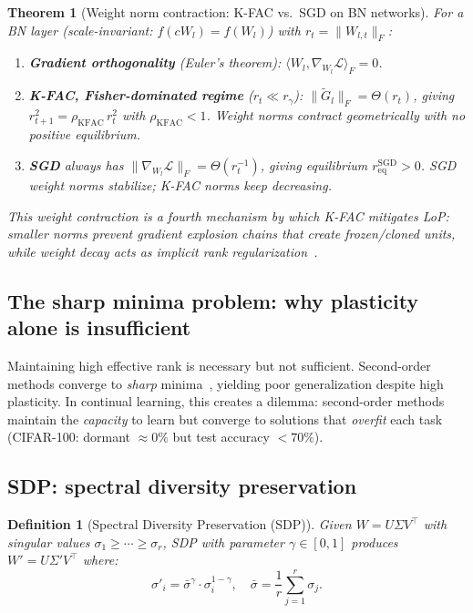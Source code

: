 \documentclass{article}
\newtheorem{theorem}{Theorem}
\newtheorem{definition}{Definition}
\newcommand{\cL}{\mathcal{L}}
\begin{document}
\begin{theorem}[Weight norm contraction: K-FAC vs.\ SGD on BN networks]
\label{thm:weight_contraction}
For a BN layer (scale-invariant: $f(cW_l) = f(W_l)$) with $r_t = \|W_{l,t}\|_F$:
\begin{enumerate}[nosep]
    \item \textbf{Gradient orthogonality} (Euler's theorem): $\langle W_l, \nabla_{W_l}\cL\rangle_F = 0$.
    \item \textbf{K-FAC, Fisher-dominated regime} ($r_t \ll r_\gamma$): $\|\tilde{G}_l\|_F = \Theta(r_t)$, giving $r_{t+1}^2 = \rho_{\mathrm{KFAC}}\, r_t^2$ with $\rho_{\mathrm{KFAC}} < 1$. Weight norms contract \emph{geometrically with no positive equilibrium}.
    \item \textbf{SGD} always has $\|\nabla_{W_l}\cL\|_F = \Theta(r_t^{-1})$, giving equilibrium $r_{\mathrm{eq}}^{\mathrm{SGD}} > 0$. SGD weight norms stabilize; K-FAC norms keep decreasing.
\end{enumerate}
This weight contraction is a fourth mechanism by which K-FAC mitigates LoP: smaller norms prevent gradient explosion chains that create frozen/cloned units, while weight decay acts as implicit rank regularization~\citep{wu2026rank}.
\end{theorem}

\subsection{The sharp minima problem: why plasticity alone is insufficient}

Maintaining high effective rank is necessary but not sufficient. Second-order methods converge to \emph{sharp} minima~\citep{keskar2017largebatch, shin2025sassha}, yielding poor generalization despite high plasticity. In continual learning, this creates a dilemma: second-order methods maintain the \emph{capacity} to learn but converge to solutions that \emph{overfit} each task (CIFAR-100: dormant $\approx 0\%$ but test accuracy $< 70\%$).

\subsection{SDP: spectral diversity preservation}

\begin{definition}[Spectral Diversity Preservation (SDP)]
\label{def:sdp}
Given $W = U \Sigma V^\top$ with singular values $\sigma_1 \geq \cdots \geq \sigma_r$, SDP with parameter $\gamma \in [0,1]$ produces $W' = U \Sigma' V^\top$ where:
\[
\sigma'_i = \bar{\sigma}^\gamma \cdot \sigma_i^{1-\gamma}, \quad \bar{\sigma} = \frac{1}{r}\sum_{j=1}^{r} \sigma_j.
\]
\end{definition}
\end{document}
